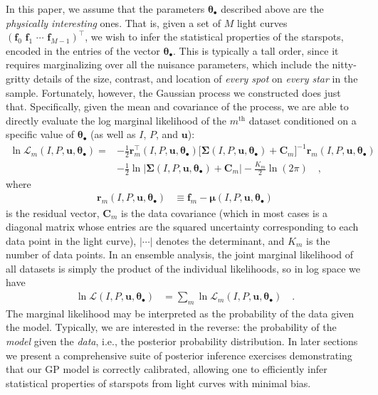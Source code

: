 \documentclass[modern]{aastex62}
\begin{document}
In this paper, we assume that the parameters $\pmb{\theta}_\bullet$
described above are the \emph{physically interesting} ones. That is,
given a set of $M$ light curves
$\left( \mathbf{f}_0 \,\, \mathbf{f}_1 \,\, \cdots \,\,  \mathbf{f}_{M-1} \right)^\top$,
we wish to infer the statistical properties of the starspots, encoded in
the entries of the vector $\pmb{\theta}_\bullet$.
%
This is typically a tall order, since it requires marginalizing over all
the nuisance parameters, which include the nitty-gritty details of the
size, contrast, and location of \emph{every spot} on \emph{every star}
in the sample. Fortunately, however, the Gaussian process we constructed
does just that. Specifically, given the mean and covariance of the process,
we are able to directly evaluate the log marginal likelihood of the $m^\mathrm{th}$
dataset
conditioned on a specific value of $\pmb{\theta}_\bullet$ (as well as $I$,
$P$, and $\mathbf{u}$):
%
\begin{align}
    \label{eq:log-like}
    \ln \mathcal{L}_m\left(I, P, \mathbf{u}, \pmb{\theta}_\bullet\right)
    =
     & -\frac{1}{2}
    \mathbf{r}_m^\top\left(I, P, \mathbf{u}, \pmb{\theta}_\bullet\right)
    \big[
        \pmb{\Sigma}\left(I, P, \mathbf{u}, \pmb{\theta}_\bullet\right)
        +
        \mathbf{C}_m
        \big]^{-1}
    \mathbf{r}_m\left(I, P, \mathbf{u}, \pmb{\theta}_\bullet\right)
    \nonumber       \\[0.75em]
     & -
    \frac{1}{2}
    \ln \Big|
    \pmb{\Sigma}\left(I, P, \mathbf{u}, \pmb{\theta}_\bullet\right)
    +
    \mathbf{C}_m
    \Big|
    -
    \frac{K_m}{2}
    \ln \left( 2 \pi \right)
    \quad,
\end{align}
%
where
%
\begin{align}
    \mathbf{r}_m\left(I, P, \mathbf{u}, \pmb{\theta}_\bullet\right)
     & \equiv
    \mathbf{f}_m - \pmb{\mu}\left(I, P, \mathbf{u}, \pmb{\theta}_\bullet\right)
\end{align}
%
is the residual vector,
%
$\mathbf{C}_m$ is the data covariance
(which in most cases is a diagonal matrix whose entries
are the squared uncertainty corresponding to each data point in the light curve),
%
$| \cdots |$ denotes the determinant, and $K_m$ is the number of data points.
In an ensemble analysis, the joint marginal likelihood of all datasets is
simply the product of the individual likelihoods, so in log space we have
%
\begin{align}
    \ln \mathcal{L}\left(I, P, \mathbf{u}, \pmb{\theta}_\bullet\right)
     & =
    \sum_{m} \ln \mathcal{L}_m\left(I, P, \mathbf{u}, \pmb{\theta}_\bullet\right)
    \quad.
\end{align}
%
The marginal likelihood may be interpreted as the probability of the data
given the model. Typically, we are interested in the reverse: the probability
of the \emph{model} given the \emph{data}, i.e., the posterior probability
distribution. In later sections we present a comprehensive suite of
posterior inference exercises demonstrating that our GP model is correctly
calibrated, allowing one to efficiently infer statistical properties of starspots
from light curves with minimal bias.
\end{document}
